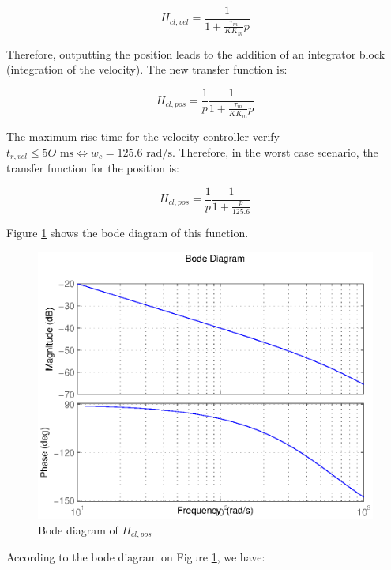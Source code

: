 \begin{equation}
 H_{cl,vel} = \frac{1}{1 + \frac{\tau_m}{K K_m}p}
\end{equation}

Therefore, outputting the position leads to the addition of an integrator block (integration of the velocity). The new transfer function is:

\begin{equation}
 H_{cl,pos} = \frac{1}{p}\frac{1}{1 + \frac{\tau_m}{K K_m}p}
\end{equation}

The maximum rise time for the velocity controller verify $t_{r,vel} \leq 5O \text{ ms} \Leftrightarrow w_c = 125.6 \text{ rad/s}$. Therefore, in the worst case scenario, the transfer function for the position is:

\begin{equation}
 H_{cl,pos} = \frac{1}{p} \frac{1}{1 + \frac{p}{125.6}}
\end{equation}

Figure \ref{bodePos} shows the bode diagram of this function.

\begin{center}
\begin{figure}[ht]
 \includegraphics[width=\linewidth]{fig/bodePos.eps}
 \caption{Bode diagram of $H_{cl,pos}$}
 \label{bodePos}
\end{figure}
\end{center}

According to the bode diagram on Figure \ref{bodePos}, we have:

